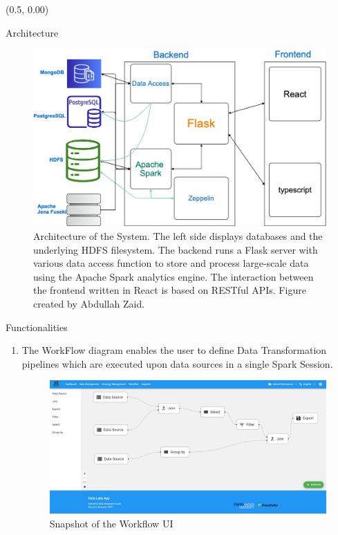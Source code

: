 \documentclass[12pt]{beamer}
\begin{document}
	\begin{textblock}{0.5}(0.5, 0.00)
		
		
		\begin{block}{Architecture}
			\begin{figure}[H]
				\includegraphics[width=0.75\linewidth,height=0.20\textheight]{data.png}
				\caption{Architecture of the System. The left side displays databases and the underlying HDFS filesystem. The backend runs a Flask server with various data access function to store and process large-scale data using the Apache Spark analytics engine. The interaction between the frontend written in React is based on RESTful APIs. Figure created by Abdullah Zaid.} \label{Figure 1}
			\end{figure} 
		\end{block}
		
		
		
		
		\begin{block}{Functionalities}
			\begin{enumerate}
				\item The WorkFlow diagram enables the user to define Data Transformation pipelines which are executed upon data sources in a single Spark Session.
				\begin{figure}[H]
					\includegraphics[width=0.93\linewidth]{datamart.JPG}
					\caption{Snapshot of the Workflow UI}
					\label{WorkFlow}
				\end{figure}   
				

\end{enumerate}
\end{block}
\end{textblock}
\end{document}
